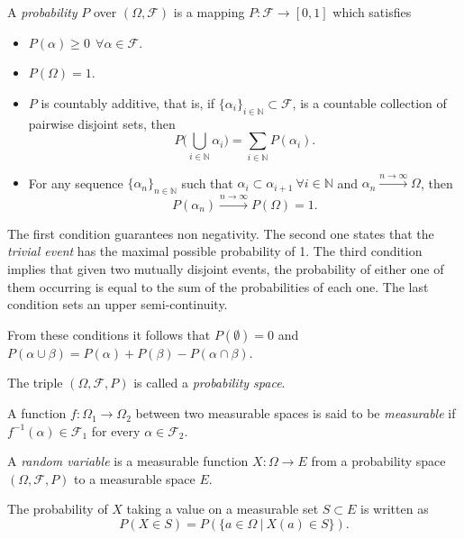 \documentclass[oneside,openright,titlepage,numbers=noenddot,openany,headinclude,footinclude=true,
  cleardoublepage=empty,abstractoff,BCOR=5mm,paper=a4,fontsize=12pt]{scrreprt}
\begin{document}
\begin{definition}
A \emph{probability} \(P\) over \((\Omega, \mathcal{F})\) is a mapping
\(P: \mathcal{F} \to [0,1]\) which satisfies
\begin{itemize}
\item \(P(\alpha) \geq 0 \ \ \forall \alpha \in \mathcal{F}\).
\item \(P(\Omega) = 1\).
\item \(P\) is countably additive, that is, if \(\{\alpha_i\}_{i \in \mathbb{N}}
  \subset \mathcal{F}\), is a countable collection of pairwise disjoint sets,
  then
  \[
  P\big(\bigcup_{i\in \mathbb{N}}\alpha_i\big) = \sum_{i\in \mathbb{N}}P(\alpha_i).
  \]
\item For any sequence {\(\{\alpha_n\}_{n \in \mathbb{N}}\)} such that \(\alpha_i \subset
  \alpha_{i+1} \ \forall i \in \mathbb{N}\) and \(\alpha_n
  \xrightarrow{n \to \infty} \Omega\), then
  \[P(\alpha_n)
  \xrightarrow{n \to \infty} P(\Omega) = 1.\]
\end{itemize}
\end{definition}

The first condition guarantees non negativity. The second one states that the
\emph{trivial event} has the maximal possible probability of 1. The third condition implies that given two mutually disjoint events,
the probability of either one of them occurring is equal to the sum of the
probabilities of each one. The last condition sets an upper semi-continuity.

From these conditions it follows that \(P(\emptyset) = 0\) and \(P(\alpha \cup \beta)
= P(\alpha) + P(\beta) - P(\alpha \cap \beta)\).

The triple \((\Omega, \mathcal{F}, P)\) is called a \emph{probability space}.

\begin{definition}
A function \(f:\Omega_1 \to \Omega_2\) between two
measurable spaces is said to be \emph{measurable} if \(f^{-1}(\alpha) \in \mathcal{F}_1\) for every \(\alpha \in \mathcal{F}_2\).
\end{definition}

\begin{definition}
A \emph{random variable} is a measurable function \(X:\Omega \to E\) from a probability
space \((\Omega, \mathcal{F}, P)\) to a measurable space \(E\).

The probability of \(X\) taking a value on a measurable set \(S \subset E\) is
written as
\[
P(X \in S) = P(\{a \in \Omega \ | \ X(a) \in S \}).
\]
\end{definition}
\end{document}
